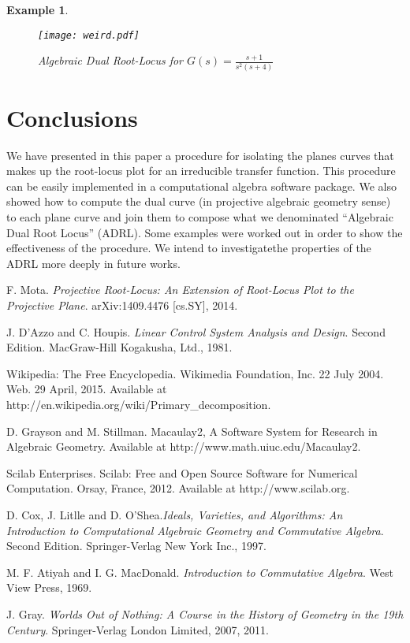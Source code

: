 \documentclass{article}
\newtheorem{example}{Example}[section]
\begin{document}
\begin{example}
\begin{figure}
\begin{center}
\texttt{[image: weird.pdf]}
\caption{\label{darlex4} Algebraic Dual Root-Locus for $\displaystyle G(s)=\frac{s+1}{s^2(s+4)}$} 
\end{center}
\end{figure} 

\end{example}


\section{Conclusions}
We have presented in this paper a procedure for isolating the planes curves that makes up 
the root-locus plot for an irreducible transfer function. This procedure can be easily implemented 
in a computational algebra software package. We also showed how to compute the dual curve
(in projective algebraic geometry sense) to each plane curve and join them to compose what 
we denominated ``Algebraic Dual Root Locus'' (ADRL). Some examples were worked out in order to show 
the effectiveness of the procedure. We intend to investigatethe properties of the ADRL 
more deeply in future works.



 

\begin{thebibliography}{00} 



 F. Mota. {\em Projective Root-Locus: An Extension of Root-Locus Plot to the Projective Plane}. 
arXiv:1409.4476 [cs.SY], 2014.

 J. D'Azzo and C. Houpis. {\em Linear Control System Analysis and Design}. Second Edition. 
MacGraw-Hill Kogakusha, Ltd., 1981. 

 Wikipedia: The Free Encyclopedia. Wikimedia Foundation, Inc. 22 July 2004. Web. 29 April, 2015. 
Available at http://en.wikipedia.org/wiki/Primary\_decomposition.

 D. Grayson and M. Stillman. Macaulay2, A Software System for Research in Algebraic Geometry. Available at 
http://www.math.uiuc.edu/Macaulay2. 

 Scilab Enterprises. Scilab: Free and Open Source Software for Numerical Computation. Orsay, France, 2012.
Available at http://www.scilab.org. 

 D. Cox, J. Litlle and D. O'Shea.{\em Ideals, Varieties, and Algorithms: An Introduction to 
Computational Algebraic
Geometry and Commutative Algebra}. Second Edition. Springer-Verlag New York Inc., 1997.


 M. F. Atiyah and I. G. MacDonald. {\em Introduction to Commutative Algebra}. West View Press, 1969.

 J. Gray. {\em Worlds Out of Nothing: A Course in the History of Geometry in the 19th Century}.
Springer-Verlag London Limited, 2007, 2011.


\end{thebibliography}
\end{document}
